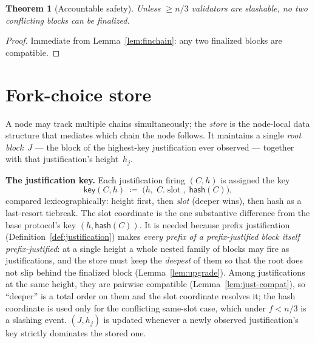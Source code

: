 \ifx\litemode\undefined\documentclass{article}\fi
\newcommand{\slot}[0]{\ensuremath{\operatorname{\mathrm{slot}}}}
\newcommand{\hash}{\mathsf{hash}}
\newcommand{\key}{\ensuremath{\mathsf{key}}}
\renewcommand{\paragraph}[1]{\vspace{7pt}\noindent\textbf{#1}}
\theoremstyle{plain}
\newtheorem{theorem}{Theorem}
\theoremstyle{definition}
\theoremstyle{remark}
\begin{document}
\begin{theorem}[Accountable safety]\label{thm:safety}
Unless $\geq n/3$ validators are slashable, no two conflicting blocks can be finalized.
\end{theorem}

\begin{proof}
Immediate from Lemma~\ref{lem:finchain}: any two finalized blocks are compatible.
\end{proof}

\section{Fork-choice store}\label{sec:store}

A node may track multiple chains simultaneously; the \emph{store} is the node-local data structure that mediates which chain the node follows.
It maintains a single \emph{root block}~$J$ --- the block of the highest-key justification ever observed --- together with that justification's height~$h_j$.

\paragraph{The justification key.}
Each justification firing $(C, h)$ is assigned the key
\[
  \key(C, h) \;\coloneqq\; \bigl(h,\; C.\slot,\; \hash(C)\bigr),
\]
compared lexicographically: height first, then \emph{slot} (deeper wins), then hash as a last-resort tiebreak.
The slot coordinate is the one substantive difference from the base protocol's key $(h, \hash(C))$.
It is needed because prefix justification (Definition~\ref{def:justification}) makes \emph{every prefix of a prefix-justified block itself prefix-justified}: at a single height a whole nested family of blocks may fire as justifications, and the store must keep the \emph{deepest} of them so that the root does not slip behind the finalized block (Lemma~\ref{lem:upgrade}).
Among justifications at the same height, they are pairwise compatible (Lemma~\ref{lem:just-compat}), so ``deeper'' is a total order on them and the slot coordinate resolves it; the hash coordinate is used only for the conflicting same-slot case, which under $f < n/3$ is a slashing event.
$(J, h_j)$ is updated whenever a newly observed justification's key strictly dominates the stored one.
\end{document}
